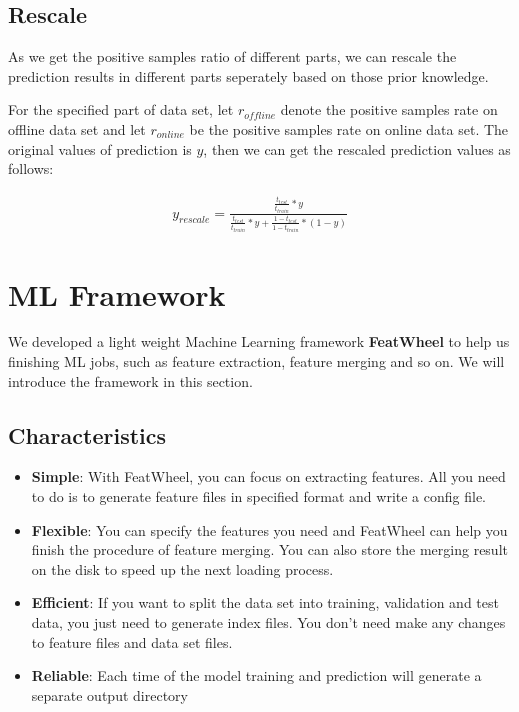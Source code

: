 \documentclass[12pt]{article}
\begin{document}
{{\subsection{Rescale}

As we get the positive samples ratio of different parts, we can rescale the prediction results in different parts seperately based on those prior knowledge.

For the specified part of data set, let $r_{offline}$ denote the positive samples rate on offline data set and let $r_{online}$ be the positive samples rate on online data set. The original values of prediction is $y$, then we can get the rescaled prediction values as follows:

\begin{eqnarray}
y_{rescale} = \frac{\frac{t_{test}}{t_{train}} * y}{\frac{t_{test}}{t_{train}} * y + \frac{1 - t_{test}}{1 - t_{train}} * (1 - y)}
\label{eqn:rescale_y}
\end{eqnarray}


\section{ML Framework}

We developed a light weight Machine Learning framework \textbf{FeatWheel} to help us finishing ML jobs, such as feature extraction, feature merging and so on. We will introduce the framework in this section.

\subsection{Characteristics}

\begin{itemize}
\label{list:characteristics}
\item \textbf{Simple}: With FeatWheel, you can focus on extracting features. All you need to do is to generate feature files in specified format and write a config file.
\item \textbf{Flexible}: You can specify the features you need and FeatWheel can help you finish the procedure of feature merging. You can also store the merging result on the disk to speed up the next loading process.
\item \textbf{Efficient}: If you want to split the data set into training, validation and test data, you just need to generate index files. You don't need make any changes to feature files and data set files.
\item \textbf{Reliable}: Each time of the model training and prediction will generate a separate output directory
\end{itemize}

}}
\end{document}
